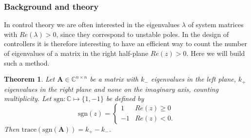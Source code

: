\documentclass[11pt]{article}
\newtheorem{theorem}{Theorem}[section]
\numberwithin{equation}{section}
\begin{document}
\subsubsection{Background and theory}
In control theory we are often interested in the eigenvalues $\lambda$ of system matrices with $Re(\lambda)>0$, since they correspond to unstable poles. In the design of controllers it is therefore interesting to have an efficient way to count the number of eigenvalues of a matrix in the right half-plane $Re(z)>0$. Here we will build such a method.
\begin{theorem}\label{thm:sign}
Let $\mathbf{A}\in\mathbb{C}^{n \times n}$ be a matrix with $k_{-}$ eigenvalues in the left plane, $k_{+}$ eigenvalues in the right plane and none on the imaginary axis, counting multiplicity. Let $\text{sgn}:\mathbb{C}\mapsto \{1,-1\}$ be defined by
$$\text{sgn}(z)= \begin{cases} 
      1 & Re(z)\geq 0 \\
      -1 & Re(z)<0. 
   \end{cases}
$$
Then $\text{trace}(\text{sgn}(\mathbf{A}))=k_{+}-k_{-}$.
\end{theorem}
\end{document}

